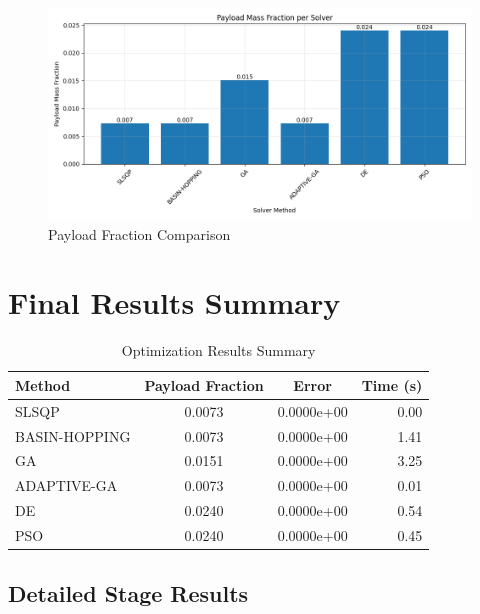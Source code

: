 \documentclass{article}
\begin{document}
\begin{figure}[H]
\centering
\includegraphics[width=\textwidth]{payload_fraction.png}
\caption{Payload Fraction Comparison}
\end{figure}

\section{Final Results Summary}
\begin{table}[H]
\centering
\caption{Optimization Results Summary}
\begin{tabular}{lccr}
\toprule
Method & Payload Fraction & Error & Time (s) \\
\midrule
SLSQP & 0.0073 & 0.0000e+00 & 0.00 \\
BASIN-HOPPING & 0.0073 & 0.0000e+00 & 1.41 \\
GA & 0.0151 & 0.0000e+00 & 3.25 \\
ADAPTIVE-GA & 0.0073 & 0.0000e+00 & 0.01 \\
DE & 0.0240 & 0.0000e+00 & 0.54 \\
PSO & 0.0240 & 0.0000e+00 & 0.45 \\
\bottomrule
\end{tabular}
\end{table}

\subsection{Detailed Stage Results}
\end{document}
